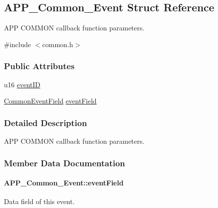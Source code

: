 \hypertarget{struct_a_p_p___common___event}{}\subsection{A\+P\+P\+\_\+\+Common\+\_\+\+Event Struct Reference}
\label{struct_a_p_p___common___event}


A\+PP C\+O\+M\+M\+ON callback function parameters.  




{\ttfamily \#include $<$common.\+h$>$}

\subsubsection*{Public Attributes}
\begin{DoxyCompactItemize}
\item 
u16 \hyperlink{struct_a_p_p___common___event_a701fbf4ff07a1083534d2bee164def3c}{event\+ID}
\item 
\hyperlink{union_common_event_field}{Common\+Event\+Field} \hyperlink{struct_a_p_p___common___event_ab658a567a349357d50fbeac19f868413}{event\+Field}
\end{DoxyCompactItemize}


\subsubsection{Detailed Description}
A\+PP C\+O\+M\+M\+ON callback function parameters. 

\subsubsection{Member Data Documentation}
\paragraph[{\texorpdfstring{event\+Field}{eventField}}]{ A\+P\+P\+\_\+\+Common\+\_\+\+Event\+::event\+Field}\hypertarget{struct_a_p_p___common___event_ab658a567a349357d50fbeac19f868413}{}\label{struct_a_p_p___common___event_ab658a567a349357d50fbeac19f868413}
Data field of this event. 
